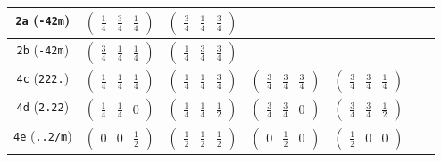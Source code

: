 \documentclass[fleqn,9pt,landscape]{jsarticle}
\begin{document}
\begin{center}
\begin{longtable}{ccccccc}
{\tt 2a} ({\tt -42m}) & $ \begin{pmatrix} \frac{1}{4} & \frac{3}{4} & \frac{1}{4} \end{pmatrix} $ & $ \begin{pmatrix} \frac{3}{4} & \frac{1}{4} & \frac{3}{4} \end{pmatrix} $ & $  $ & $  $ & $  $ & $  $ \\ \hline
{\tt 2b} ({\tt -42m}) & $ \begin{pmatrix} \frac{3}{4} & \frac{1}{4} & \frac{1}{4} \end{pmatrix} $ & $ \begin{pmatrix} \frac{1}{4} & \frac{3}{4} & \frac{3}{4} \end{pmatrix} $ & $  $ & $  $ & $  $ & $  $ \\ \hline
{\tt 4c} ({\tt 222.}) & $ \begin{pmatrix} \frac{1}{4} & \frac{1}{4} & \frac{1}{4} \end{pmatrix} $ & $ \begin{pmatrix} \frac{1}{4} & \frac{1}{4} & \frac{3}{4} \end{pmatrix} $ & $ \begin{pmatrix} \frac{3}{4} & \frac{3}{4} & \frac{3}{4} \end{pmatrix} $ & $ \begin{pmatrix} \frac{3}{4} & \frac{3}{4} & \frac{1}{4} \end{pmatrix} $ & $  $ & $  $ \\ \hline
{\tt 4d} ({\tt 2.22}) & $ \begin{pmatrix} \frac{1}{4} & \frac{1}{4} & 0 \end{pmatrix} $ & $ \begin{pmatrix} \frac{1}{4} & \frac{1}{4} & \frac{1}{2} \end{pmatrix} $ & $ \begin{pmatrix} \frac{3}{4} & \frac{3}{4} & 0 \end{pmatrix} $ & $ \begin{pmatrix} \frac{3}{4} & \frac{3}{4} & \frac{1}{2} \end{pmatrix} $ & $  $ & $  $ \\ \hline
{\tt 4e} ({\tt ..2/m}) & $ \begin{pmatrix} 0 & 0 & \frac{1}{2} \end{pmatrix} $ & $ \begin{pmatrix} \frac{1}{2} & \frac{1}{2} & \frac{1}{2} \end{pmatrix} $ & $ \begin{pmatrix} 0 & \frac{1}{2} & 0 \end{pmatrix} $ & $ \begin{pmatrix} \frac{1}{2} & 0 & 0 \end{pmatrix} $ & $  $ & $  $ \\ \hline

\end{longtable}
\end{center}
\end{document}
